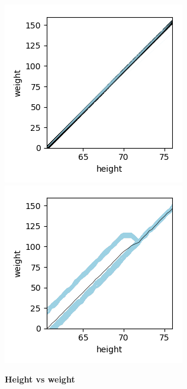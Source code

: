 \documentclass[12pt]{article}
\begin{document}
\begin{figure}[htbp]
\begin{center}
\includegraphics[scale=0.7]{images/height_vs_weight_stratpd.png}
\includegraphics[scale=0.7]{images/height_vs_weight_pdp.png}
\caption{{\bf  Height vs weight}}
\label{fig:height_vs_weight}
\end{center}
\end{figure}
\end{document}
